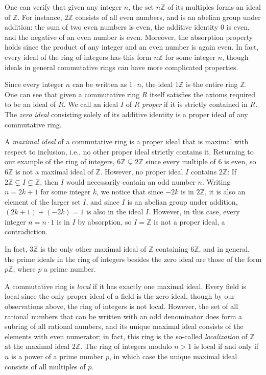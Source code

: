 \documentclass{article}
\begin{document}
One can verify that given any integer $n$, the set $n\mathbb{Z}$ of its multiples forms an ideal of $\mathbb{Z}$.  For instance, $2 \mathbb{Z}$ consists of all even numbers, and is an abelian group under addition: the sum of two even numbers is even, the additive identity $0$ is even, and the negative of an even number is even.
Moreover, the absorption property holds since the product of any integer and an even number is again even. 
In fact, every ideal of the ring of integers has this form $n\mathbb{Z}$ for some integer $n$, though ideals in general commutative rings can have more complicated properties. 

Since every integer $n$ can be written as $1 \cdot n$, the ideal $1 \mathbb{Z}$ is the entire ring $\mathbb{Z}$.   One can see that given a commutative ring $R$ itself satisfies the axioms required to be an ideal of $R$.  We call an ideal $I$ of $R$ \emph{proper} if it is strictly contained in $R$.  The \emph{zero ideal} consisting solely of its additive identity is a proper ideal of any commutative ring. 

A \emph{maximal ideal} of a commutative ring is a proper ideal that is maximal with respect to inclusion, i.e., no other proper ideal strictly contains it. 
Returning to our example of the ring of integers, $6 \mathbb{Z} \subsetneq 2 \mathbb{Z}$ since every multiple of $6$ is even, 
so $6 \mathbb{Z}$ is not a maximal ideal of $\mathbb{Z}$. 
However, no proper ideal $I$ contains $2 \mathbb{Z}$:  If $2 \mathbb{Z}\subsetneq I \subsetneq \mathbb{Z}$, then $I$  would necessarily contain an odd number $n$.  Writing $n=2k+1$ for some integer $k$, we notice that since $-2k$ is in $2\mathbb{Z}$, it is also an element of the larger set $I$, and since $I$ is an abelian group under addition, $(2k+1) + (-2k) = 1$ is also in the ideal $I$. 
However, in this case, every integer $n = n \cdot 1$ is in $I$ by absorption, so $I = \mathbb{Z}$ is not a proper ideal, a contradiction. 

In fact, $3 \mathbb{Z}$ is the only other maximal ideal of $\mathbb{Z}$ containing $6 \mathbb{Z}$, and in general, the prime ideals in the ring of integers besides the zero ideal are those of the form $p \mathbb{Z}$, where $p$ a prime number. 
 
A commutative ring is \emph{local} if it has exactly one maximal ideal.  
Every field is local since the only proper ideal of a field is the zero ideal, though by our observations above, the ring of integers is not local. 
However, the set of all rational numbers that can be written with an odd denominator does form a subring of all rational numbers, and its unique maximal ideal consists of the elements with even numerator; in fact, this ring is the so-called \emph{localization} of $\mathbb{Z}$ at the maximal ideal $2 \mathbb{Z}$.  
The ring of integers modulo $n>1$ is local if and only if $n$ is a power of a prime number $p$,  in which case the unique maximal ideal consists of all multiples of $p$. 
\end{document}
